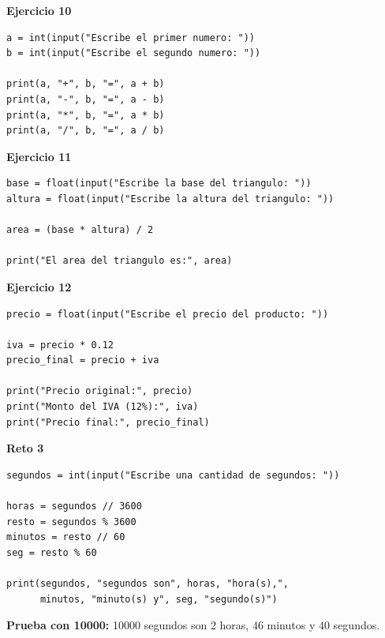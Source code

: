 \documentclass[12pt,a4paper]{article}
\begin{document}
\begin{cajaSolucion}
\textbf{Ejercicio 10}
\begin{lstlisting}[style=pythonStyle]
a = int(input("Escribe el primer numero: "))
b = int(input("Escribe el segundo numero: "))

print(a, "+", b, "=", a + b)
print(a, "-", b, "=", a - b)
print(a, "*", b, "=", a * b)
print(a, "/", b, "=", a / b)
\end{lstlisting}
\end{cajaSolucion}

\begin{cajaSolucion}
\textbf{Ejercicio 11}
\begin{lstlisting}[style=pythonStyle]
base = float(input("Escribe la base del triangulo: "))
altura = float(input("Escribe la altura del triangulo: "))

area = (base * altura) / 2

print("El area del triangulo es:", area)
\end{lstlisting}
\end{cajaSolucion}

\begin{cajaSolucion}
\textbf{Ejercicio 12}
\begin{lstlisting}[style=pythonStyle]
precio = float(input("Escribe el precio del producto: "))

iva = precio * 0.12
precio_final = precio + iva

print("Precio original:", precio)
print("Monto del IVA (12%):", iva)
print("Precio final:", precio_final)
\end{lstlisting}
\end{cajaSolucion}

\begin{cajaSolucion}
\textbf{Reto 3}
\begin{lstlisting}[style=pythonStyle]
segundos = int(input("Escribe una cantidad de segundos: "))

horas = segundos // 3600
resto = segundos % 3600
minutos = resto // 60
seg = resto % 60

print(segundos, "segundos son", horas, "hora(s),",
      minutos, "minuto(s) y", seg, "segundo(s)")
\end{lstlisting}
\textbf{Prueba con 10000:} 10000 segundos son 2 horas, 46 minutos y 40 segundos.
\end{cajaSolucion}

\end{document}
